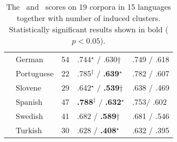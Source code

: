 \begin{table}[ht]
\begin{tabular}{l|l|l|l|l|}
    & German      & 54   & .744$^\star$ / .630$\dagger$& .749 / .618\\
    & Portuguese  & 22   & .785$^\ddagger$ / {\bf .639}$^\star$ & .782 / .607\\
    & Slovene     & 29   & .642$^\star$ / {\bf.539}$\dagger$    & .638 / .469\\
    & Spanish     & 47   & {\bf.788}$^\ddagger$ / {\bf .632}$^\star$          & .753/ .602\\
    & Swedish     & 41   & .682 / {\bf.589}$\dagger$        & .681 / .546\\
    & Turkish     & 30   & .628 / {\bf .408}$^\star$        & .632 / .395\\ \hline
  \end{tabular}
  \caption{The \mto\ and \vm\ scores on 19 corpora in 15 languages together
  with number of induced clusters.  Statistically significant results shown
  in bold ($p < 0.05$).
}  
  \label{tab:multiresults}
\end{table}
